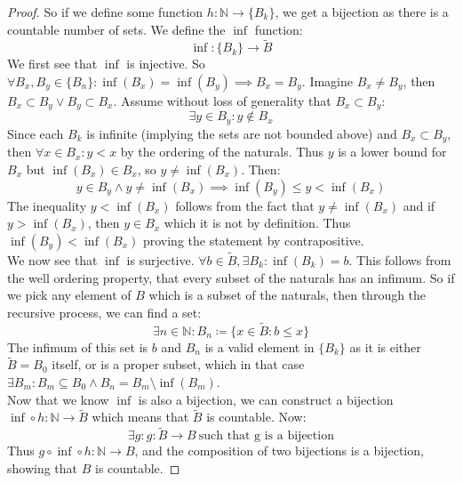 \documentclass{article}
\begin{document}
\begin{proof}
So if we define some function $h: \mathbb{N} \xrightarrow{} \{B_k\}$, we get a bijection as there is a countable number of sets. We define the $\inf$ function:
\begin{equation*}
    \inf: \{B_k\}  \xrightarrow{} \tilde{B}
\end{equation*}
We first see that $\inf$ is injective. So $\forall B_x, B_y \in \{B_n\}: \inf(B_x) = \inf(B_y) \implies B_x = B_y$. Imagine $B_x \neq B_y$, then $B_x \subset B_y \lor B_y \subset B_x$. Assume without loss of generality that $B_x \subset B_y$:
\begin{equation*}
    \exists y \in B_y: y \notin B_x
\end{equation*}
Since each $B_k$ is infinite (implying the sets are not bounded above) and $B_x \subset B_y$, then $\forall x \in B_x: y < x$ by the ordering of the naturals. Thus $y$ is a lower bound for $B_x$ but $\inf(B_x) \in B_x$, so $y \neq \inf(B_x)$. Then:
\begin{equation}
    y \in B_y \land y \neq \inf(B_x) \implies \inf(B_y) \leqslant y < \inf(B_x)
\end{equation}
The inequality $y < \inf(B_x)$ follows from the fact that $y \neq \inf(B_x)$ and if $y > \inf(B_x)$, then $y \in B_x$ which it is not by definition. Thus $\inf(B_y) < \inf(B_x)$ proving the statement by contrapositive.\\

We now see that $\inf$ is surjective. $\forall b \in \tilde{B}, \exists B_k: \inf(B_k) = b$. This follows from the well ordering property, that every subset of the naturals has an infimum. So if we pick any element of $B$ which is a subset of the naturals, then through the recursive process, we can find a set:
\begin{equation*}
    \exists n \in \mathbb{N}: B_n \coloneq \{x \in \tilde{B}: b \leqslant x\}
\end{equation*}
The infimum of this set is $b$ and $B_n$ is a valid element in $\{B_k\}$ as it is either $\tilde{B} = B_0$ itself, or is a proper subset, which in that case $\exists B_{m}: B_{m} \subseteq B_0 \land B_n = B_m\setminus \inf(B_m)$.\\

Now that we know $\inf$ is also a bijection, we can construct a bijection $\inf \circ h: \mathbb{N} \xrightarrow{} \tilde{B}$ which means that $\tilde{B}$ is countable. Now:
\begin{equation*}
    \exists g: g: \tilde{B} \xrightarrow{} B \ \text{such that g is a bijection}
\end{equation*}
Thus $g \circ \inf \circ h: \mathbb{N} \xrightarrow{} B$, and the composition of two bijections is a bijection, showing that $B$ is countable.
\end{proof}
\end{document}
